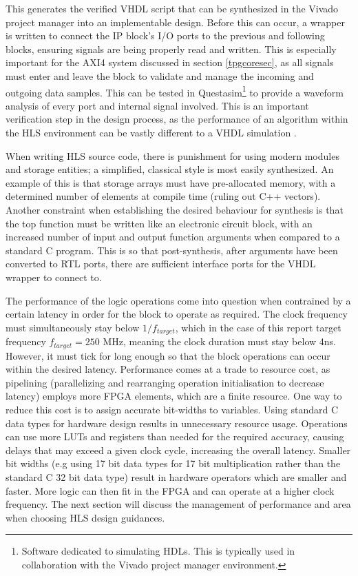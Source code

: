 \documentclass[10pt]{article}
\begin{document}
\begin{enumerate}
	This generates the verified VHDL script that can be synthesized in the Vivado project manager into an implementable design. Before this can occur, a wrapper is written to connect the IP block's I/O ports to the previous and following blocks, ensuring signals are being properly read and written. This is especially important for the AXI4 system discussed in section \ref{tpgcoresec}, as all signals must enter and leave the block to validate and manage the incoming and outgoing data samples. This can be tested in Questasim\footnote{Software dedicated to simulating HDLs. This is typically used in collaboration with the Vivado project manager environment.} to provide a waveform analysis of every port and internal signal involved. This is an important verification step in the design process, as the performance of an algorithm within the HLS environment can be vastly different to a VHDL simulation \cite{vivado_design_suite_user_guide_2018}.
\end{enumerate}

When writing HLS source code, there is punishment for using modern modules and storage entities; a simplified, classical style is most easily synthesized. An example of this is that storage arrays must have pre-allocated memory, with a determined number of elements at compile time (ruling out C++ vectors). Another constraint when establishing the desired behaviour for synthesis is that the top function must be written like an electronic circuit block, with an increased number of input and output function arguments when compared to a standard C program. This is so that post-synthesis, after arguments have been converted to RTL ports, there are sufficient interface ports for the VHDL wrapper to connect to.

The performance of the logic operations come into question when contrained by a certain latency in order for the block to operate as required. The clock frequency must simultaneously stay below $1/f_{target}$, which in the case of this report target frequency $f_{target} = 250$ MHz, meaning the clock duration must stay below 4ns. However, it must tick for long enough so that the block operations can occur within the desired latency. Performance comes at a trade to resource cost, as pipelining (parallelizing and rearranging operation initialisation to decrease latency) employs more FPGA elements, which are a finite resource. One way to reduce this cost is to assign accurate bit-widths to variables. Using standard C data types for hardware design results in unnecessary resource usage. Operations can use more LUTs and registers than needed for the required accuracy, causing delays that may exceed a given clock cycle, increasing the overall latency. Smaller bit widths (e.g using 17 bit data types for 17 bit multiplication rather than the standard C 32 bit data type) result in hardware operators which are smaller and faster. More logic can then fit in the FPGA and can operate at a higher clock frequency. The next section will discuss the management of performance and area when choosing HLS design guidances.
\end{document}
